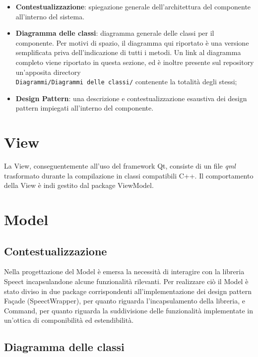 \documentclass[openany,12pt,a4paper]{report}
\begin{document}
	\begin{itemize}
		\item \textbf{Contestualizzazione}: spiegazione generale dell'architettura del componente all'interno del sistema.
		\item \textbf{Diagramma delle classi}: diagramma generale delle classi per il componente. Per motivi di spazio, il diagramma qui riportato è una versione semplificata priva dell'indicazione di tutti i metodi. Un link al diagramma completo viene riportato in questa sezione, ed è inoltre presente sul repository un'apposita directory \\ \verb|Diagrammi/Diagrammi delle classi/| contenente la totalità degli stessi;
		\item \textbf{Design Pattern}: una descrizione e contestualizzazione esaustiva dei design pattern impiegati all'interno del componente.
	\end{itemize} 
	
	\section{View}
	
	La View, conseguentemente all’uso del framework Qt, consiste di un file \textit{qml} trasformato durante la compilazione in classi compatibili C++. Il comportamento della View è indi gestito dal package ViewModel. 
	
	\section{Model}
	
	\subsection{Contestualizzazione}
	
	Nella progettazione del Model è emersa la necessità di interagire con la libreria Speect incapsulandone alcune funzionalità rilevanti. Per realizzare ciò il Model è stato diviso in due package corrispondenti all'implementazione dei design pattern Façade (SpeectWrapper), per quanto riguarda l'incapsulamento della libreria, e Command, per quanto riguarda la suddivisione delle funzionalità implementate in un'ottica di componibilità ed estendibilità.  
	
	\subsection{Diagramma delle classi}
	
\end{document}
